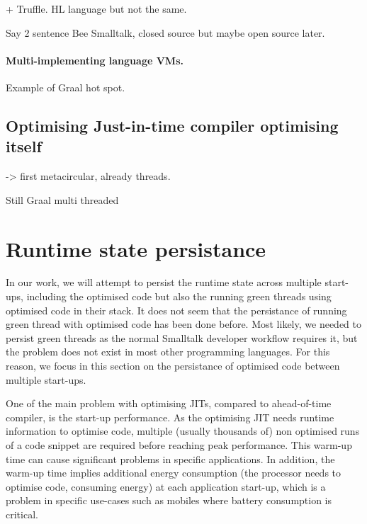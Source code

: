 \documentclass[a4paper,12pt,twoside]{../includes/ThesisStyle}
\begin{document}
\cite{Unga05b}
+ Truffle. HL language but not the same.

Say 2 sentence Bee Smalltalk, closed source but maybe open source later.

\paragraph{Multi-implementing language VMs.}

Example of Graal hot spot.
 

\subsection{Optimising Just-in-time compiler optimising itself}

-> first metacircular, already threads.

Still Graal multi threaded


\section{Runtime state persistance}
\label{sec:persistance}

In our work, we will attempt to persist the runtime state across multiple start-ups, including the optimised code but also the running green threads using optimised code in their stack. It does not seem that the persistance of running green thread with optimised code has been done before. Most likely, we needed to persist green threads as the normal Smalltalk developer workflow requires it, but the problem does not exist in most other programming languages. For this reason, we focus in this section on the persistance of optimised code between multiple start-ups.

One of the main problem with optimising JITs, compared to ahead-of-time compiler, is the start-up performance. As the optimising JIT needs runtime information to optimise code, multiple (usually thousands of) non optimised runs of a code snippet are required before reaching peak performance. This warm-up time can cause significant problems in specific applications. In addition, the warm-up time implies additional energy consumption (the processor needs to optimise code, consuming energy) at each application start-up, which is a problem in specific use-cases such as mobiles where battery consumption is critical.
\end{document}
